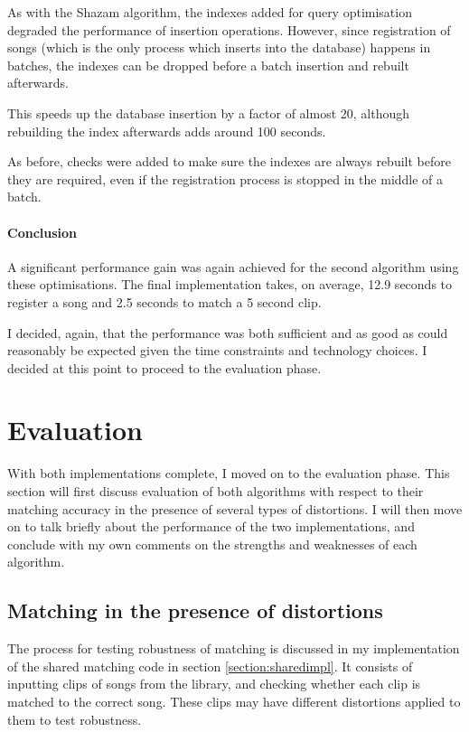 \documentclass[12pt,a4paper,twoside,openright]{report}
\begin{document}
As with the Shazam algorithm, the indexes added for query optimisation degraded the performance of insertion operations. However, since registration of songs (which is the only process which inserts into the database) happens in batches, the indexes can be dropped before a batch insertion and rebuilt afterwards.

This speeds up the database insertion by a factor of almost 20, although rebuilding the index afterwards adds around 100 seconds.

As before, checks were added to make sure the indexes are always rebuilt before they are required, even if the registration process is stopped in the middle of a batch.


\subsubsection{Conclusion}

A significant performance gain was again achieved for the second algorithm using these optimisations. The final implementation takes, on average, 12.9 seconds to register a song and 2.5 seconds to match a 5 second clip.

I decided, again, that the performance was both sufficient and as good as could reasonably be expected given the time constraints and technology choices. I decided at this point to proceed to the evaluation phase.



\chapter{Evaluation}
\label{evaluation}

With both implementations complete, I moved on to the evaluation phase. This section will first discuss evaluation of both algorithms with respect to their matching accuracy in the presence of several types of distortions. I will then move on to talk briefly about the performance of the two implementations, and conclude with my own comments on the strengths and weaknesses of each algorithm.


\section{Matching in the presence of distortions}
\label{evaluation:matching_with_distortion}

The process for testing robustness of matching is discussed in my implementation of the shared matching code in section \ref{section:sharedimpl}. It consists of inputting clips of songs from the library, and checking whether each clip is matched to the correct song. These clips may have different distortions applied to them to test robustness.
\end{document}
